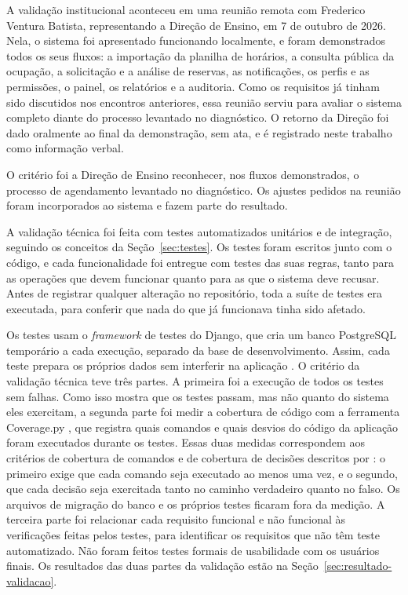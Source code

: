 A validação institucional aconteceu em uma reunião remota com Frederico Ventura Batista, representando a Direção de Ensino, em 7 de outubro de 2026. Nela, o sistema foi apresentado funcionando localmente, e foram demonstrados todos os seus fluxos: a importação da planilha de horários, a consulta pública da ocupação, a solicitação e a análise de reservas, as notificações, os perfis e as permissões, o painel, os relatórios e a auditoria. Como os requisitos já tinham sido discutidos nos encontros anteriores, essa reunião serviu para avaliar o sistema completo diante do processo levantado no diagnóstico. O retorno da Direção foi dado oralmente ao final da demonstração, sem ata, e é registrado neste trabalho como informação verbal.

O critério foi a Direção de Ensino reconhecer, nos fluxos demonstrados, o processo de agendamento levantado no diagnóstico. Os ajustes pedidos na reunião foram incorporados ao sistema e fazem parte do resultado.

A validação técnica foi feita com testes automatizados unitários e de integração, seguindo os conceitos da Seção~\ref{sec:testes}. Os testes foram escritos junto com o código, e cada funcionalidade foi entregue com testes das suas regras, tanto para as operações que devem funcionar quanto para as que o sistema deve recusar. Antes de registrar qualquer alteração no repositório, toda a suíte de testes era executada, para conferir que nada do que já funcionava tinha sido afetado.

Os testes usam o \textit{framework} de testes do Django, que cria um banco PostgreSQL temporário a cada execução, separado da base de desenvolvimento. Assim, cada teste prepara os próprios dados sem interferir na aplicação \cite{djangodocs}. O critério da validação técnica teve três partes. A primeira foi a execução de todos os testes sem falhas. Como isso mostra que os testes passam, mas não quanto do sistema eles exercitam, a segunda parte foi medir a cobertura de código com a ferramenta Coverage.py \cite{coveragepy}, que registra quais comandos e quais desvios do código da aplicação foram executados durante os testes. Essas duas medidas correspondem aos critérios de cobertura de comandos e de cobertura de decisões descritos por : o primeiro exige que cada comando seja executado ao menos uma vez, e o segundo, que cada decisão seja exercitada tanto no caminho verdadeiro quanto no falso. Os arquivos de migração do banco e os próprios testes ficaram fora da medição. A terceira parte foi relacionar cada requisito funcional e não funcional às verificações feitas pelos testes, para identificar os requisitos que não têm teste automatizado. Não foram feitos testes formais de usabilidade com os usuários finais. Os resultados das duas partes da validação estão na Seção~\ref{sec:resultado-validacao}.

